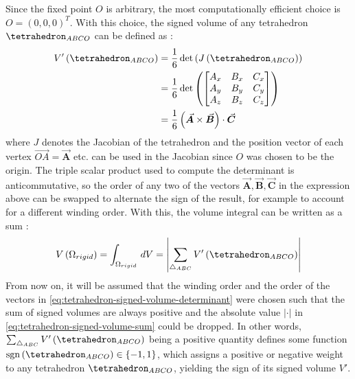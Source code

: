 \documentclass[oneside, a4paper]{book}
\newcommand\abs[1]{\left|#1\right|}
\newcommand\vek[1]{\vec{\bm{#1}}}
\newcommand\br[1]{\left(#1\right)}
\DeclareMathOperator{\sgn}{sgn}
\begin{document}
    Since the fixed point $O$ is arbitrary, the most computationally efficient choice is $O=\br{0,0,0}^T$. With this choice, the signed volume of any tetrahedron $\tetrahedron_{ABCO}$ can be defined as \autocites{efficient-feature-extraction}{explicit-exact-tetrahedron-formulas}:
    \begin{align}
      V'\br{\tetrahedron_{ABCO}} &= \frac{1}{6}\det\br{J\br{\tetrahedron_{ABCO}}}\\
      &= \frac{1}{6}\det\br{\begin{bmatrix}
      A_x&B_x&C_x\\A_y&B_y&C_y\\A_z&B_z&C_z
      \end{bmatrix}}\\
      &= \frac{1}{6}\br{\vek{A} \times \vek{B}} \cdot \vek{C}\label{eq:tetrahedron-signed-volume-determinant}
    \end{align}
    where $J$ denotes the Jacobian of the tetrahedron and the position vector of each vertex $\overrightarrow{OA}=\vek{A}$ etc. can be used in the Jacobian since $O$ was chosen to be the origin. The triple scalar product used to compute the determinant is anticommutative, so the order of any two of the vectors $\vek{A},\vek{B},\vek{C}$ in the expression above can be swapped to alternate the sign of the result, for example to account for a different winding order. With this, the volume integral can be written as a sum \autocite{efficient-feature-extraction}:
    \begin{equation}\label{eq:tetrahedron-signed-volume-sum}
      V\br{\Omega_{rigid}} = \int_{\Omega_{rigid}} \,dV = \abs{\sum_{\triangle_{ABC}} V'\br{\tetrahedron_{ABCO}}}
    \end{equation}
    From now on, it will be assumed that the winding order and the order of the vectors in \autoref{eq:tetrahedron-signed-volume-determinant} were chosen such that the sum of signed volumes are always positive and the absolute value $\abs{\cdot}$ in \autoref{eq:tetrahedron-signed-volume-sum} could be dropped. In other words, $\sum_{\triangle_{ABC}} V'\br{\tetrahedron_{ABCO}}$ being a positive quantity defines some function $\sgn\br{\tetrahedron_{ABCO}}\in\{-1,1\}$, which assigns a positive or negative weight to any tetrahedron $\tetrahedron_{ABCO}$, yielding the sign of its signed volume $V'$.
\end{document}
